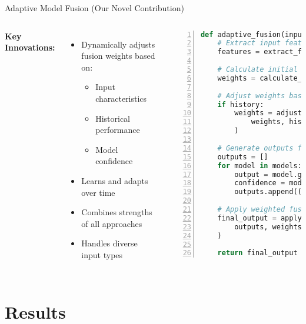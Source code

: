 \documentclass{beamer}
\begin{document}
\begin{frame}[fragile]{Adaptive Model Fusion (Our Novel Contribution)}
\begin{columns}[T]
\textbf{Key Innovations:}
\begin{itemize}
    \item Dynamically adjusts fusion weights based on:
    \begin{itemize}
        \item Input characteristics
        \item Historical performance
        \item Model confidence
    \end{itemize}
    \item Learns and adapts over time
    \item Combines strengths of all approaches
    \item Handles diverse input types
\end{itemize}
\begin{lstlisting}[language=Python, basicstyle=\ttfamily\tiny, numbers=left, numberstyle=\tiny\color{codegray}, breaklines=true, backgroundcolor=\color{backcolour}, commentstyle=\color{codegreen}, keywordstyle=\color{magenta}, stringstyle=\color{codepurple}]
def adaptive_fusion(input_text, task, models, history):
    # Extract input features
    features = extract_features(input_text)

    # Calculate initial weights based on features
    weights = calculate_initial_weights(features, task)

    # Adjust weights based on historical performance
    if history:
        weights = adjust_weights_from_history(
            weights, history, features
        )

    # Generate outputs from all models
    outputs = []
    for model in models:
        output = model.generate(input_text)
        confidence = model.get_confidence(output)
        outputs.append((output, confidence))

    # Apply weighted fusion
    final_output = apply_weighted_fusion(
        outputs, weights
    )

    return final_output
\end{lstlisting}
\end{columns}
\end{frame}

\section{Results}
\end{document}
